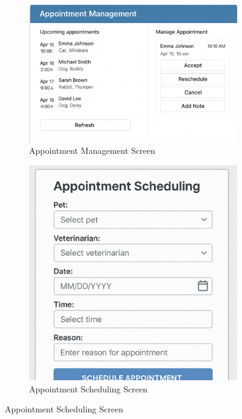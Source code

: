 \documentclass[12pt,a4paper,twoside]{book}
\begin{document}
\begin{figure}[H]
    \centering
    \begin{subfigure}[b]{0.48\textwidth}
        \centering
        \includegraphics[width=\textwidth]{Resources/Mockup Screens/Appointment_Management.png}
        \caption{Appointment Management Screen}\label{fig:mockup7}
    \end{subfigure}
    \hfill
    \begin{subfigure}[b]{0.48\textwidth}
        \centering
        \includegraphics[width=\textwidth]{Resources/Mockup Screens/Appointment_Scheduling.png}
        \caption{Appointment Scheduling Screen}\label{fig:mockup8}
    \end{subfigure}
\end{figure}
\end{document}

